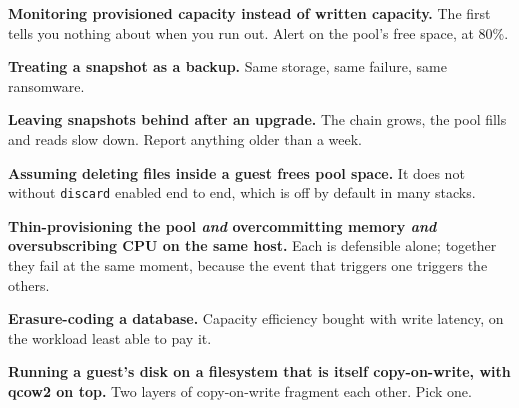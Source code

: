 \begin{pitfall}
\begin{tight}
  \item \textbf{Monitoring provisioned capacity instead of written capacity.}
        The first tells you nothing about when you run out. Alert on the pool's
        free space, at 80\%.
  \item \textbf{Treating a snapshot as a backup.} Same storage, same failure,
        same ransomware.
  \item \textbf{Leaving snapshots behind after an upgrade.} The chain grows, the
        pool fills and reads slow down. Report anything older than a week.
  \item \textbf{Assuming deleting files inside a guest frees pool space.} It
        does not without \texttt{discard} enabled end to end, which is off by
        default in many stacks.
  \item \textbf{Thin-provisioning the pool \emph{and} overcommitting memory
        \emph{and} oversubscribing CPU on the same host.} Each is defensible
        alone; together they fail at the same moment, because the event that
        triggers one triggers the others.
  \item \textbf{Erasure-coding a database.} Capacity efficiency bought with
        write latency, on the workload least able to pay it.
  \item \textbf{Running a guest's disk on a filesystem that is itself
        copy-on-write, with qcow2 on top.} Two layers of copy-on-write
        fragment each other. Pick one.
\end{tight}
\end{pitfall}

